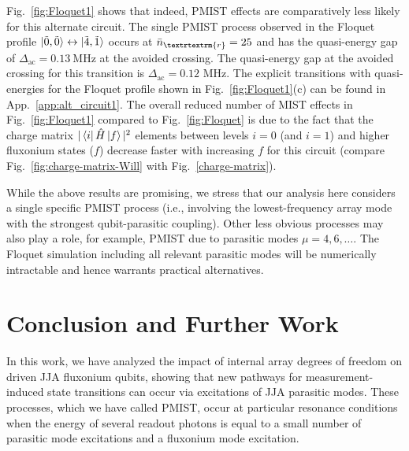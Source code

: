 \documentclass[%
reprint,
superscriptaddress,
 amsmath,amssymb,
 aps,
 prx,
longbibliography,
floatfix,
]{revtex4-2}
\begin{document}
Fig.~\ref{fig:Floquet1} shows that indeed, PMIST effects are comparatively less likely for this alternate circuit. The single PMIST process observed in the Floquet profile $\ket{\tilde{0},\tilde{0}}\leftrightarrow\ket{\tilde{4},\tilde{1}}$ occurs at $\bar n_\textrtextrm{r}=25$ and has the quasi-energy gap of $\Delta_\textrm{ac}=0.13 \ \mathrm{MHz}$ at the avoided crossing. The quasi-energy gap at the avoided crossing for this transition is $\Delta_\textrm{ac}=0.12$ MHz. The explicit transitions with quasi-energies for the Floquet profile shown in Fig.~\ref{fig:Floquet1}(c) can be found in App.~\ref{app:alt_circuit1}. The overall reduced number of MIST effects in Fig.~\ref{fig:Floquet1} compared to Fig.~\ref{fig:Floquet} is due to the fact that the charge matrix $|\bra{i}\hat H\ket{f}|^2$ elements between levels $i=0$ (and $i=1$) and higher fluxonium states ($f$) decrease faster with increasing $f$ for this circuit (compare Fig.~\ref{fig:charge-matrix-Will} with Fig.~\ref{charge-matrix}).

While the above results are promising, we stress that our analysis here considers a single specific PMIST process (i.e., involving the lowest-frequency array mode with the strongest qubit-parasitic coupling). Other less obvious processes may also play a role, for example, PMIST due to parasitic modes $\mu=4,6,\ldots$. The Floquet simulation including all relevant parasitic modes will be numerically intractable and hence warrants practical alternatives.

\section{Conclusion and Further Work}\label{sec:conclusion}
In this work, we have analyzed the impact of internal array degrees of freedom on driven JJA fluxonium qubits, showing that new pathways for measurement-induced state transitions can occur via excitations of JJA parasitic modes. These processes, which we have called PMIST, occur at particular resonance conditions when the energy of several readout photons is equal to a small number of parasitic mode excitations and a fluxonium mode excitation.
\end{document}
